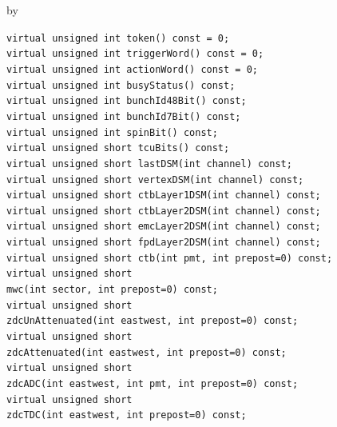 \documentclass[twoside]{article}
\newcommand{\entrylabel}[1]{\mbox{\textbf{{#1}}}\hfil}%
\newenvironment{entry}
{\begin{list}{}%
    {\renewcommand{\makelabel}{\entrylabel}%
     \setlength{\labelwidth}{90pt}%
     \setlength{\leftmargin}{\labelwidth}
     \advance\leftmargin by \labelsep%
      }%
    }%
  {\end{list}}
\newcommand{\Entrylabel}[1]%
{\raisebox{0pt}[1ex][0pt]{\makebox[\labelwidth][l]%
    {\parbox[t]{\labelwidth}{\hspace{0pt}\textbf{{#1}}}}}}
\newenvironment{Entry}%
{\renewcommand{\entrylabel}{\Entrylabel}\begin{entry}}%
  {\end{entry}}
\begin{document}
\begin{Entry}
    \verb+virtual unsigned int token() const = 0;+\\
    \verb+virtual unsigned int triggerWord() const = 0;+\\
    \verb+virtual unsigned int actionWord() const = 0; +\\
    \verb+virtual unsigned int busyStatus() const;+\\
    \verb+virtual unsigned int bunchId48Bit() const;+\\
    \verb+virtual unsigned int bunchId7Bit() const;+\\
    \verb+virtual unsigned int spinBit() const;+\\
    \verb+virtual unsigned short tcuBits() const;+\\
    \verb+virtual unsigned short lastDSM(int channel) const;+\\
    \verb+virtual unsigned short vertexDSM(int channel) const;+\\
    \verb+virtual unsigned short ctbLayer1DSM(int channel) const;+\\
    \verb+virtual unsigned short ctbLayer2DSM(int channel) const;+\\
    \verb+virtual unsigned short emcLayer2DSM(int channel) const;+\\
    \verb+virtual unsigned short fpdLayer2DSM(int channel) const;+\\
    \verb+virtual unsigned short ctb(int pmt, int prepost=0) const;+\\
    
    \verb+virtual unsigned short+\\
    \verb+mwc(int sector, int prepost=0) const;+\\

    \verb+virtual unsigned short+\\
    \verb+zdcUnAttenuated(int eastwest, int prepost=0) const;+\\

    \verb+virtual unsigned short+\\
    \verb+zdcAttenuated(int eastwest, int prepost=0) const;+\\

    \verb+virtual unsigned short+\\
    \verb+zdcADC(int eastwest, int pmt, int prepost=0) const;+\\

    \verb+virtual unsigned short+\\
    \verb+zdcTDC(int eastwest, int prepost=0) const;+\\


\end{Entry}
\end{document}
